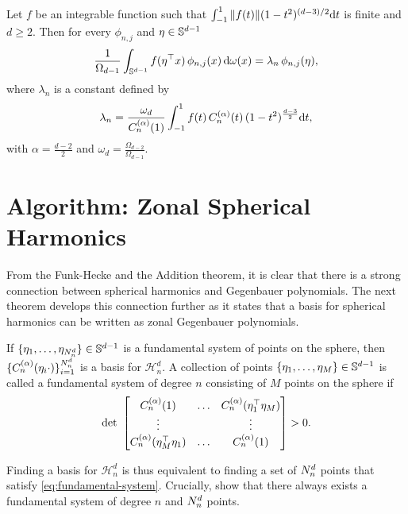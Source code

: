 \begin{theorem}
    \label{appendix:theorem:funk}
    Let $f$ be an integrable function such that $\int_{-1}^1 \| f(t)\| (1 - t^2)^{(d-3)/2} \mathrm{d}{t}$ is finite and $d \ge 2$. Then for every $\phi_{n,j}$  and $\eta \in \mathbb{S}^{d-1}$
    \begin{equation}
        \frac{1}{\Omega_{d-1}} \int_{\mathbb{S}^{d-1}} f(\eta^{\top} x)\,\phi_{n, j}(x)\, \mathrm{d}{\omega(x)} = {\lambda}_{n}\,\phi_{n,j}(\eta),
    \end{equation}
    where ${\lambda}_{n}$ is a constant defined by
    \begin{equation}
        \lambda_{n}  = 
        \frac{\omega_{d}}{C_n^{(\alpha)}(1)} \int_{-1}^1 f(t)\,C_n^{(\alpha)}(t)\,(1 - t^2)^{\frac{d-3}{2}} \mathrm{d}{t},
    \end{equation}
    with $\alpha = \frac{d-2}{2}$ and $\omega_d = \frac{\Omega_{d-2}}{\Omega_{d-1}}$.
\end{theorem}

\section{Algorithm: Zonal Spherical Harmonics}
\label{sec:zonal-spherical-harmonics}

From the Funk-Hecke and the Addition theorem, it is clear that there is a strong connection between spherical harmonics and Gegenbauer polynomials. The next theorem develops this connection further as it states that a basis for spherical harmonics can be written as zonal Gegenbauer polynomials. %

\begin{theorem}
    If $\{\eta_1, \ldots, \eta_{N^d_n} \} \in \mathbb{S}^{d-1}$ is a fundamental system of points on the sphere, then $\{C_n^{(\alpha)}(\eta_i \cdot)\}_{i=1}^{N^d_n}$ is a basis for $\mathcal{H}_n^d$. A collection of points $\{\eta_1, \ldots, \eta_M \} \in \mathbb{S}^{d-1}$ is called a fundamental system of degree $n$ consisting of $M$ points on the sphere if
    \begin{equation}
        \label{eq:fundamental-system}
        \textrm{det}\ 
        \begin{bmatrix}
            C_n^{(\alpha)}(1) & \ldots & C_n^{(\alpha)}(\eta_1\transpose\eta_M) \\
            \vdots & & \vdots \\
            C_n^{(\alpha)}(\eta_M\transpose\eta_1) & \ldots & C_n^{(\alpha)}(1)
        \end{bmatrix} > 0.
    \end{equation}
\end{theorem}
Finding a basis for $\mathcal{H}_n^d$ is thus equivalent to finding a set of $N^d_n$ points that satisfy \cref{eq:fundamental-system}. Crucially, \citet[Lemma~3]{dai2013} show that there always exists a fundamental system of degree $n$ and $N^d_n$ points.

